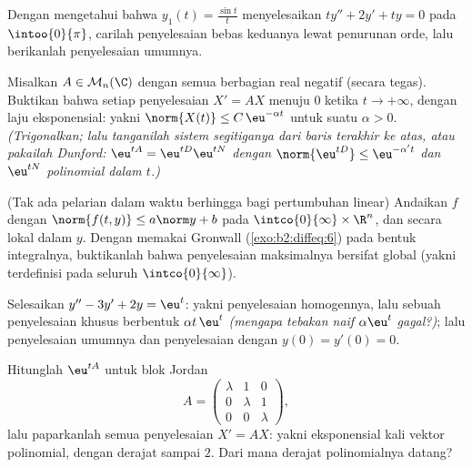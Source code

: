 \begin{exercise}[$\star\star$]\label{exo:b2:diffeq:7}
Dengan mengetahui bahwa $y_1(t) = \frac{\sin t}{t}$ menyelesaikan $ty'' + 2y' + ty =
0$ pada $\intoo{0}{\pi}$, carilah penyelesaian bebas keduanya lewat
penurunan orde, lalu berikanlah penyelesaian umumnya.
\end{exercise}

\begin{exercise}[$\star\star\star$]\label{exo:b2:diffeq:8}
Misalkan $A \in \mathcal{M}_n(\C)$ dengan semua  berbagian real
negatif (secara tegas). Buktikan bahwa setiap penyelesaian $X' = AX$ menuju
$0$ ketika $t \to +\infty$, dengan laju eksponensial: yakni $\norm{X(t)}
\leq C\,\eu^{-\alpha t}$ untuk suatu $\alpha > 0$.
\emph{(Trigonalkan; lalu tanganilah sistem segitiganya dari baris terakhir
ke atas, atau pakailah Dunford: $\eu^{tA} = \eu^{tD}\eu^{tN}$ dengan
$\norm{\eu^{tD}} \leq \eu^{-\alpha' t}$ dan $\eu^{tN}$ polinomial
dalam $t$.)}
\end{exercise}

\begin{exercise}[$\star\star\star$]\label{exo:b2:diffeq:9}
(Tak ada pelarian dalam waktu berhingga bagi pertumbuhan linear) Andaikan $f$
 dengan $\norm{f(t, y)} \leq a\norm y + b$ pada
$\intco{0}{\infty} \times \R^n$, dan  secara lokal dalam $y$. Dengan memakai
Gronwall (\cref{exo:b2:diffeq:6}) pada bentuk integralnya, buktikanlah bahwa
penyelesaian maksimalnya bersifat global (yakni terdefinisi pada seluruh
$\intco{0}{\infty}$).
\end{exercise}

\begin{exercise}[$\star$]\label{exo:b2:diffeq:10}
Selesaikan $y'' - 3y' + 2y = \eu^{t}$: yakni penyelesaian homogennya, lalu sebuah
penyelesaian khusus berbentuk $\alpha t\,\eu^{t}$ \emph{(mengapa
tebakan naif $\alpha\eu^t$ gagal?)}; lalu penyelesaian umumnya dan
penyelesaian dengan $y(0) = y'(0) = 0$.
\end{exercise}

\begin{exercise}[$\star\star$]\label{exo:b2:diffeq:11}
Hitunglah $\eu^{tA}$ untuk blok Jordan
\[
A = \begin{pmatrix} \lambda & 1 & 0\\ 0 & \lambda & 1\\
0 & 0 & \lambda\end{pmatrix},
\]
lalu paparkanlah semua penyelesaian $X' = AX$: yakni eksponensial kali
vektor polinomial, dengan derajat sampai $2$. Dari mana derajat
polinomialnya datang?
\end{exercise}

